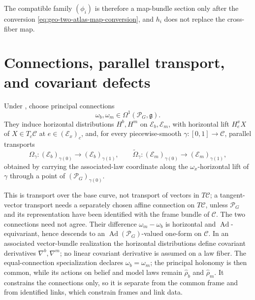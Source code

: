 The compatible family \((\phi_i)\) is therefore a map-bundle section only after the conversion
\eqref{eq:geo-two-atlas-map-conversion}, and \(h_i\) does not replace the cross-fiber map.

\section{Connections, parallel transport, and covariant defects}
\label{sec:geo-three-transports}

Under , choose principal connections
\begin{equation}
\omega_b,\omega_m\in\Omega^1(\mathscr P_G,\mathfrak g).
\label{eq:geo-principal-connections}
\end{equation}
They induce horizontal distributions \(H^b,H^m\) on \(\mathcal E_b,\mathcal E_m\), with horizontal
lift \(H_e^xX\) of \(X\in T_c\mathcal C\) at \(e\in(\mathcal E_x)_c\), and, for every
piecewise-smooth \(\gamma:[0,1]\to\mathcal C\), parallel transports
\begin{equation}
\Omega_\gamma:
(\mathcal E_b)_{\gamma(0)}\longrightarrow(\mathcal E_b)_{\gamma(1)},
\qquad
\widetilde\Omega_\gamma:
(\mathcal E_m)_{\gamma(0)}\longrightarrow(\mathcal E_m)_{\gamma(1)},
\label{eq:geo-base-parallel-transports}
\end{equation}
obtained by carrying the associated-law coordinate along the \(\omega_x\)-horizontal lift of
\(\gamma\) through a point of \((\mathscr P_G)_{\gamma(0)}\).

This is transport over the base curve, not transport of vectors in \(T\mathcal C\); a
tangent-vector transport needs a separately chosen affine connection on \(T\mathcal C\), unless
\(\mathscr P_G\) and its representation have been identified with the frame bundle of
\(\mathcal C\). The two connections need not agree. Their difference \(\omega_m-\omega_b\) is
horizontal and \(\operatorname{Ad}\)-equivariant, hence descends to an
\(\operatorname{Ad}(\mathscr P_G)\)-valued one-form on \(\mathcal C\). In an associated vector-bundle
realization the horizontal distributions define covariant derivatives \(\nabla^b,\nabla^m\); no
linear covariant derivative is assumed on a law fiber. The equal-connection specialization declares
\(\omega_b=\omega_m\); the principal holonomy is then common, while its actions on belief and model
laws remain \(\widehat\rho_b\) and \(\widehat\rho_m\). It constrains the connections only, so it is
separate from the common frame and from identified links, which constrain frames and link data.

